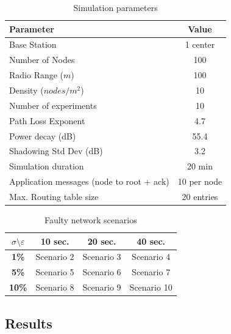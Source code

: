 \begin{table}[!ht]
\centering
\caption{Simulation parameters}
\label{tab:conf}
\begin{tabular}{@{}lc@{}}
\toprule
\multicolumn{1}{l}{\textbf{Parameter}} & \textbf{Value} \\ \midrule
Base Station                           & 1 center       \\
Number of Nodes                        & 100            \\
Radio Range ($m$)                      & 100            \\
Density ($nodes/m^{2}$)                & 10             \\
Number of experiments                              & 10             \\
Path Loss Exponent                     & 4.7            \\
Power decay (dB)                       & 55.4           \\
Shadowing Std Dev (dB)                 & 3.2            \\
Simulation duration                 & 20 min            \\
Application messages (node to root + ack)  & 10 per node \\
Max. Routing table size & 20 entries \\
\bottomrule
\end{tabular}
\end{table}



\begin{table}[]
\centering
\caption{Faulty network scenarios}
\label{tab:scn}
\begin{tabular}{|c|c|c|c|}
\hline
\textbf{$\sigma$$\setminus$$\varepsilon$} & \textbf{10 sec.} & \textbf{20 sec.} & \textbf{40 sec.}\\ \hline
\textbf{1\%}     & Scenario 2            & Scenario 3        & Scenario 4              \\ \hline
\textbf{5\%}     & Scenario 5            & Scenario 6        & Scenario 7             \\ \hline
\textbf{10\%}    & Scenario 8            & Scenario 9        & Scenario 10              \\ \hline
\end{tabular}
\end{table}


\subsection{Results}\label{subsec:res}


